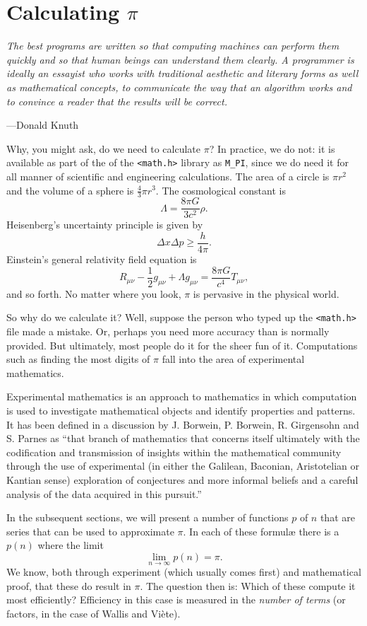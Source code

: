 \section{Calculating $\pi$}

\epigraph{\emph{The best programs are written so that computing machines
    can perform them quickly and so that human beings can understand
    them clearly. A programmer is ideally an essayist who works with
    traditional aesthetic and literary forms as well as mathematical
concepts, to communicate the way that an algorithm works and to convince
a reader that the results will be correct.}}{---Donald Knuth}\noindent

Why, you might ask, do we need to calculate $\pi$? In practice, we do
not: it is available as part of the of the \texttt{<math.h>} library as
\texttt{M\_PI}, since we do need it for all manner of scientific and
engineering calculations. The area of a circle is $\pi r^2$ and the
volume of a sphere is $\frac{4}{3} \pi r^3.$  The cosmological constant
is $$\Lambda = \frac{8 \pi G}{3 c^2} \rho.$$  Heisenberg's uncertainty
principle is given by $$\Delta x \Delta p \ge \frac{h}{4 \pi}.$$
Einstein's general relativity field equation is $$R_{\mu\nu} -
\frac{1}{2}g_{\mu\nu} +\Lambda g_{\mu\nu} = \frac{8 \pi G}{c^4}
T_{\mu\nu},$$ and so forth. No matter where you look, $\pi$ is pervasive
in the physical world.

So why do we calculate it? Well, suppose the person who typed up the
\texttt{<math.h>} file made a mistake.  Or, perhaps you need more
accuracy than is normally provided. But ultimately, most people do it
for the sheer fun of it. Computations such as finding the most digits of
$\pi$ fall into the area of experimental mathematics.

Experimental mathematics is an approach to mathematics in which
computation is used to investigate mathematical objects and identify
properties and patterns. It has been defined in a discussion by
J.\xspace Borwein, P.\xspace Borwein, R.\xspace Girgensohn and S.\xspace
Parnes as ``that branch of mathematics that concerns itself ultimately
with the codification and transmission of insights within the
mathematical community through the use of experimental (in either the
Galilean, Baconian, Aristotelian or Kantian sense) exploration of
conjectures and more informal beliefs and a careful analysis of the data
acquired in this pursuit.''

In the subsequent sections, we will present a number of functions $p$
of $n$ that are series that can be used to approximate $\pi$. In each of
these formul\ae\xspace there is a $p(n)$ where the limit
$$\lim_{n\rightarrow\infty} p(n) = \pi.$$ We know, both through
experiment (which usually comes first) and mathematical proof, that
these do result in $\pi$. The question then is: Which of these compute
it most efficiently? Efficiency in this case is measured in the
\emph{number of terms} (or factors, in the case of Wallis and Vi\`{e}te).

